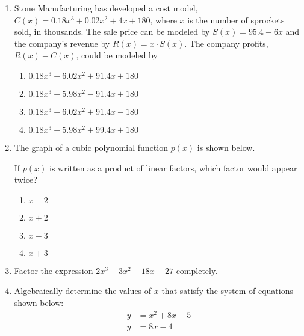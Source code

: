 \documentclass[12pt, twoside]{article}
\begin{document}
\begin{enumerate}
\item Stone Manufacturing has developed a cost model, $C(x) = 0.18x^3 + 0.02x^2 + 4x + 180$, where $x$ is the number of sprockets sold, in thousands. The sale price can be modeled by $S(x) = 95.4 - 6x$ and the company's revenue by $R(x) = x \cdot S(x)$. The company profits, $R(x) - C(x)$, could be modeled by
    \begin{enumerate}
        \item $0.18x^3 + 6.02x^2 + 91.4x + 180$
        \item $0.18x^3 - 5.98x^2 - 91.4x + 180$
        \item $0.18x^3 - 6.02x^2 + 91.4x - 180$
        \item $0.18x^3 + 5.98x^2 + 99.4x + 180$
    \end{enumerate}

\item The graph of a cubic polynomial function $p(x)$ is shown below.
    \begin{center}
    \end{center}
    If $p(x)$ is written as a product of linear factors, which factor would appear twice?
    \begin{multicols}{2}
        \begin{enumerate}
            \item $x - 2$
            \item $x + 2$
            \item $x - 3$
            \item $x + 3$
        \end{enumerate}
    \end{multicols}

    \item Factor the expression $2x^3 - 3x^2 - 18x + 27$ completely.
    
    \item Algebraically determine the values of $x$ that satisfy the system of equations shown below:
        \begin{align*}
        y &= x^2 + 8x - 5 \\
        y &= 8x - 4
        \end{align*}
    

\end{enumerate}
\end{document}
